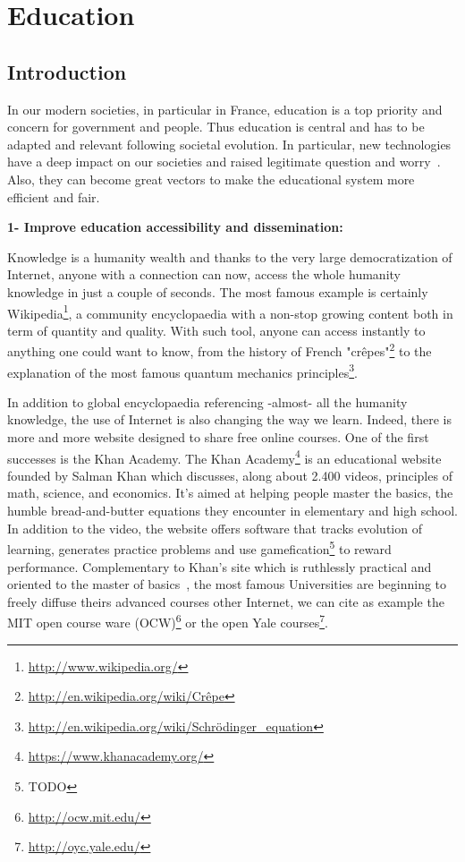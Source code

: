 

\cleartoleftpage


\chapter{Education} %


\section{Introduction} %

In our modern societies, in particular in France, education is a top priority and concern for government and people. Thus education is central and has to be adapted and relevant following societal evolution. In particular, new technologies have a deep impact on our societies and raised legitimate question and worry~\cite{plester2008txt}. Also, they can become great vectors to make the educational system more efficient and fair.


\textbf{1- Improve education accessibility and dissemination:}

Knowledge is a humanity wealth and thanks to the very large democratization of Internet, anyone with a connection can now, access the whole humanity knowledge in just a couple of seconds. The most famous example is certainly Wikipedia\footnote{\url{http://www.wikipedia.org/}}, a community encyclopaedia with a non-stop growing content both in term of quantity and quality. With such tool, anyone can access instantly to anything one could want to know, from the history of French "crêpes"\footnote{\url{http://en.wikipedia.org/wiki/Crêpe}} to the explanation of the most famous quantum mechanics principles\footnote{\url{http://en.wikipedia.org/wiki/Schrödinger_equation}}.

In addition to global encyclopaedia referencing -almost- all the humanity knowledge, the use of Internet is also changing the way we learn. Indeed, there is more and more website designed to share free online courses. One of the first successes is the Khan Academy.
The Khan Academy\footnote{\url{https://www.khanacademy.org/}} is an educational website founded by Salman Khan which discusses, along about 2.400 videos, principles of math, science, and economics.  It's aimed at helping people master the basics, the humble bread-and-butter equations they encounter in elementary and high school. In addition to the video, the website offers software that tracks evolution of learning, generates practice problems and use gamefication\footnote{TODO} to reward performance.
Complementary to Khan's site which is ruthlessly practical and oriented to the master of basics~\cite{thompson2011khan}, the most famous Universities are beginning to freely diffuse theirs advanced courses other Internet, we can cite as example the MIT open course ware (OCW)\footnote{\url{http://ocw.mit.edu/}} or the open Yale courses\footnote{\url{http://oyc.yale.edu/}}.

